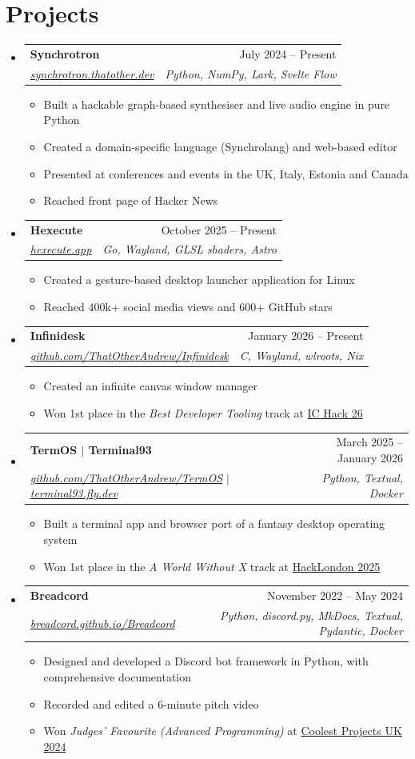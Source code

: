 \documentclass[letterpaper,11pt]{article}
\makeatletter
\newcommand{\resumeItem}[1]{
  \item\small{
    {#1 \vspace{-2pt}}
  }
}
\newcommand{\resumeSubheading}[4]{
  \vspace{-2pt}\item
    \begin{tabular*}{0.97\textwidth}[t]{l@{\extracolsep{\fill}}r}
      \textbf{#1} & #2 \\
      \textit{\small#3} & \textit{\small #4} \\
    \end{tabular*}\vspace{-7pt}
}
\newcommand{\resumeSubHeadingListStart}{\begin{itemize}[leftmargin=0.15in, label={}]}
\newcommand{\resumeSubHeadingListEnd}{\end{itemize}}
\newcommand{\resumeItemListStart}{\begin{itemize}}
\newcommand{\resumeItemListEnd}{\end{itemize}\vspace{-5pt}}
\makeatother
\begin{document}
\section{Projects}
    \resumeSubHeadingListStart
      \resumeSubheading
          {Synchrotron}{July 2024 -- Present}
          {\href{https://synchrotron.thatother.dev}{synchrotron.thatother.dev}}{Python, NumPy, Lark, Svelte Flow}
          \resumeItemListStart
            \resumeItem{Built a hackable graph-based synthesiser and live audio engine in pure Python}
            \resumeItem{Created a domain-specific language (Synchrolang) and web-based editor}
            \resumeItem{Presented at conferences and events in the UK, Italy, Estonia and Canada}
            \resumeItem{Reached front page of Hacker News}
          \resumeItemListEnd
      \resumeSubheading
          {Hexecute}{October 2025 -- Present}
          {\href{https://hexecute.app}{hexecute.app}}{Go, Wayland, GLSL shaders, Astro}
          \resumeItemListStart
            \resumeItem{Created a gesture-based desktop launcher application for Linux}
            \resumeItem{Reached 400k+ social media views and 600+ GitHub stars}
          \resumeItemListEnd
      \resumeSubheading
          {Infinidesk}{January 2026 -- Present}
          {\href{https://github.com/ThatOtherAndrew/Infinidesk}{github.com/ThatOtherAndrew/Infinidesk}}{C, Wayland, wlroots, Nix}
          \resumeItemListStart
            \resumeItem{Created an infinite canvas window manager}
            \resumeItem{Won 1st place in the \emph{Best Developer Tooling} track at \href{https://ic-hack-26.devpost.com/}{IC Hack 26}}
          \resumeItemListEnd
      \resumeSubheading
          {TermOS $|$ Terminal93}{March 2025 -- January 2026}
          {\href{https://github.com/ThatOtherAndrew/TermOS}{github.com/ThatOtherAndrew/TermOS} $|$ \href{https://terminal93.fly.dev}{terminal93.fly.dev}}{Python, Textual, Docker}
          \resumeItemListStart
            \resumeItem{Built a terminal app and browser port of a fantasy desktop operating system}
            \resumeItem{Won 1st place in the \emph{A World Without X} track at \href{https://www.huzzle.com/events/hacklondon-2025-884200}{HackLondon 2025}}
          \resumeItemListEnd
      \resumeSubheading
          {Breadcord}{November 2022 -- May 2024}
          {\href{https://breadcord.github.io/Breadcord}{breadcord.github.io/Breadcord}}{Python, discord.py, MkDocs, Textual, Pydantic, Docker}
          \resumeItemListStart
            \resumeItem{Designed and developed a Discord bot framework in Python, with comprehensive documentation}
            \resumeItem{Recorded and edited a 6-minute pitch video}
            \resumeItem{Won \emph{Judges' Favourite (Advanced Programming)} at \href{https://online.coolestprojects.org/}{Coolest Projects UK 2024}}
          \resumeItemListEnd
    \resumeSubHeadingListEnd
\end{document}

